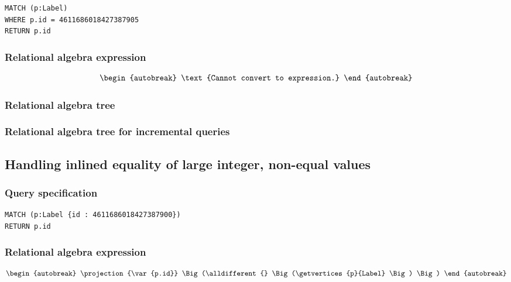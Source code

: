 \begin{lstlisting}
MATCH (p:Label)
WHERE p.id = 4611686018427387905
RETURN p.id
\end{lstlisting}

\subsubsection*{Relational algebra expression}

\begin{align*}
\begin{autobreak}
\text{Cannot convert to expression.}
\end{autobreak}
\end{align*}

\subsubsection*{Relational algebra tree}


\subsubsection*{Relational algebra tree for incremental queries}


\subsection{Handling inlined equality of large integer, non-equal values}

\subsubsection*{Query specification}

\begin{lstlisting}
MATCH (p:Label {id : 4611686018427387900})
RETURN p.id
\end{lstlisting}

\subsubsection*{Relational algebra expression}

\begin{align*}
\begin{autobreak}
\projection{\var{p.id}} \Big(\alldifferent{} \Big(\getvertices{p}{Label}
\Big)
\Big)
\end{autobreak}
\end{align*}

